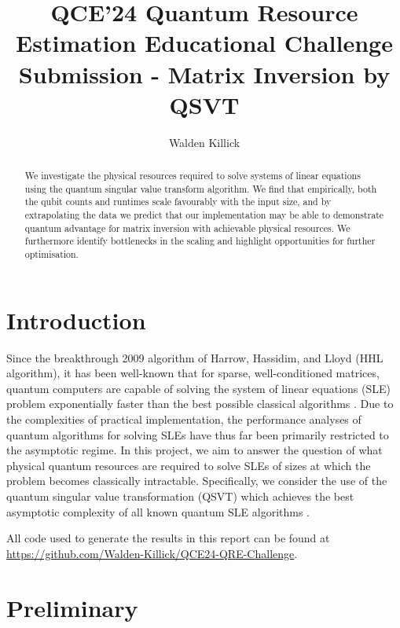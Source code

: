 \documentclass[10pt, twocolumn]{article}
\begin{document}
\title{QCE'24 Quantum Resource Estimation Educational Challenge Submission - Matrix Inversion by QSVT}
\author{Walden Killick}

\maketitle

\begin{abstract}
	We investigate the physical resources required to solve systems of linear equations using the quantum singular value transform algorithm. We find that empirically, both the qubit counts and runtimes scale favourably with the input size, and by extrapolating the data we predict that our implementation may be able to demonstrate quantum advantage for matrix inversion with achievable physical resources. We furthermore identify bottlenecks in the scaling and highlight opportunities for further optimisation.
\end{abstract}

\section{Introduction}

Since the breakthrough 2009 algorithm of Harrow, Hassidim, and Lloyd (HHL algorithm), it has been well-known that for sparse, well-conditioned matrices, quantum computers are capable of solving the system of linear equations (SLE) problem exponentially faster than the best possible classical algorithms \cite{harrow2009quantum}. Due to the complexities of practical implementation, the performance analyses of quantum algorithms for solving SLEs have thus far been primarily restricted to the asymptotic regime. In this project, we aim to answer the question of what physical quantum resources are required to solve SLEs of sizes at which the problem becomes classically intractable. Specifically, we consider the use of the quantum singular value transformation (QSVT) which achieves the best asymptotic complexity of all known quantum SLE algorithms \cite{gilyen2019quantum, martyn2021grand}.

All code used to generate the results in this report can  be found at \href{https://github.com/Walden-Killick/QCE24-QRE-Challenge}{https://github.com/Walden-Killick/QCE24-QRE-Challenge}.

\section{Preliminary}
\end{document}

